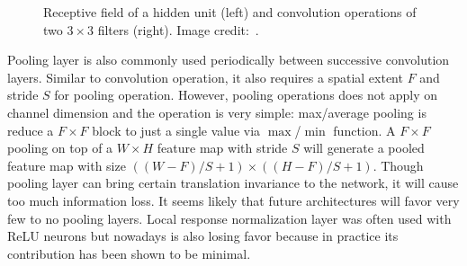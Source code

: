 \begin{figure}[t!]
    \caption{Receptive field of a hidden unit (left) and convolution operations of two $3\times 3$ filters (right). Image credit:~\cite{links:cs231n}.}
    \label{fig:ch3-recepandconv}
\end{figure}

Pooling layer is also commonly used periodically between successive convolution layers. Similar to convolution operation, it also requires a spatial extent $F$ and stride $S$ for pooling operation. However, pooling operations does not apply on channel dimension and the operation is very simple: max/average pooling is reduce a $F\times F$ block to just a single value via $\max$/$\min$ function. A $F\times F$ pooling on top of a $W\times H$ feature map with stride $S$ will generate a pooled feature map with size $((W-F)/S+1) \times ((H-F)/S+1)$. Though pooling layer can bring certain translation invariance to the network, it will cause too much information loss. It seems likely that future architectures will favor very few to no pooling layers. Local response normalization layer was often used with ReLU neurons but nowadays is also losing favor because in practice its contribution has been shown to be minimal.

